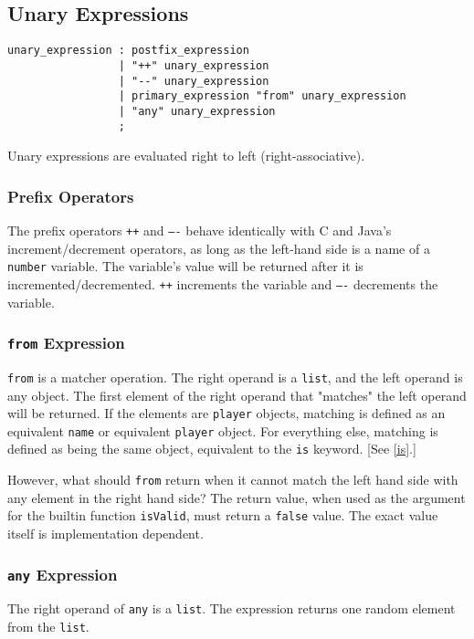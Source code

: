 \subsection{Unary Expressions}
\begin{verbatim}
unary_expression : postfix_expression
                 | "++" unary_expression
                 | "--" unary_expression
                 | primary_expression "from" unary_expression
                 | "any" unary_expression
                 ;
\end{verbatim}
Unary expressions are evaluated right to left (right-associative).

\subsubsection{Prefix Operators}
The prefix operators \texttt{++} and \texttt{----} behave identically with C and Java's increment/decrement operators, as long as the left-hand side is a name of a \texttt{number} variable. The variable's value will be returned after it is incremented/decremented. \texttt{++} increments the variable and \texttt{----} decrements the variable.

\subsubsection{\texttt{from} Expression}
\texttt{from} is a matcher operation. The right operand is a
\texttt{list}, and the left operand is any object. The first element
of the right operand that "matches" the left operand will be
returned. If the elements are \texttt{player} objects, matching is
defined as an equivalent \texttt{name} or equivalent \texttt{player}
object. For everything else, matching is defined as being the same
object, equivalent to the \texttt{is} keyword. [See \ref{is}.]

However, what should \texttt{from} return when it cannot match the
left hand side with any element in the right hand side? The return
value, when used as the argument for the builtin function
\texttt{isValid}, must return a \texttt{false} value. The exact value
itself is implementation dependent.

\subsubsection{\texttt{any} Expression}
The right operand of \texttt{any} is a \texttt{list}. The expression returns one random element from the \texttt{list}.

